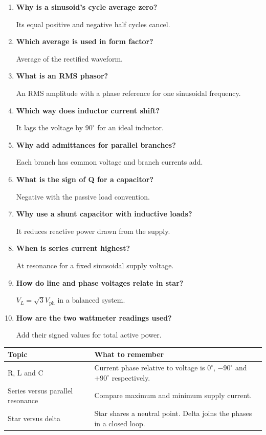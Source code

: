 \documentclass[12pt,a4paper]{article}
\newcommand{\Q}[1]{\textbf{#1}\par\noindent\ignorespaces}
\begin{document}
\begin{tcolorbox}[exambox, title={Frequently Asked / Viva Questions}]
\begin{enumerate}[topsep=0pt, label=\textbf{Q\arabic*.}, itemsep=5pt]
  \item \Q{Why is a sinusoid's cycle average zero?} Its equal positive and negative half cycles cancel.
  \item \Q{Which average is used in form factor?} Average of the rectified waveform.
  \item \Q{What is an RMS phasor?} An RMS amplitude with a phase reference for one sinusoidal frequency.
  \item \Q{Which way does inductor current shift?} It lags the voltage by $90^\circ$ for an ideal inductor.
  \item \Q{Why add admittances for parallel branches?} Each branch has common voltage and branch currents add.
  \item \Q{What is the sign of Q for a capacitor?} Negative with the passive load convention.
  \item \Q{Why use a shunt capacitor with inductive loads?} It reduces reactive power drawn from the supply.
  \item \Q{When is series current highest?} At resonance for a fixed sinusoidal supply voltage.
  \item \Q{How do line and phase voltages relate in star?} $V_L=\sqrt3 V_{\mathrm{ph}}$ in a balanced system.
  \item \Q{How are the two wattmeter readings used?} Add their signed values for total active power.
\end{enumerate}
\end{tcolorbox}

\begin{tcolorbox}[tikzbox, title={Summary Reference}]
\begin{tabularx}{\linewidth}{|B{4.0cm}|Y|}\hline
Topic & \textbf{What to remember} \\ \hline
R, L and C & Current phase relative to voltage is $0^\circ$, $-90^\circ$ and $+90^\circ$ respectively. \\ \hline
Series versus parallel resonance & Compare maximum and minimum supply current. \\ \hline
Star versus delta & Star shares a neutral point. Delta joins the phases in a closed loop. \\ \hline
\end{tabularx}
\end{tcolorbox}
\end{document}

